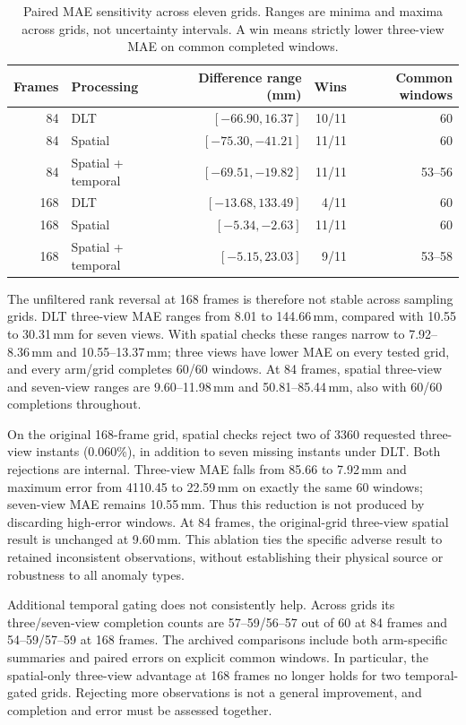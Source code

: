 \documentclass{iopjournal}
\begin{document}
\begin{table}
\caption{Paired MAE sensitivity across eleven grids. Ranges are minima and
maxima across grids, not uncertainty intervals. A win means strictly lower
three-view MAE on common completed windows.}
\centering
\begin{tabular}{rlrrr}
\hline
Frames & Processing & Difference range (mm) & Wins & Common windows\\
\hline
84 & DLT & $[-66.90,16.37]$ & 10/11 & 60\\
84 & Spatial & $[-75.30,-41.21]$ & 11/11 & 60\\
84 & Spatial + temporal & $[-69.51,-19.82]$ & 11/11 & 53--56\\
168 & DLT & $[-13.68,133.49]$ & 4/11 & 60\\
168 & Spatial & $[-5.34,-2.63]$ & 11/11 & 60\\
168 & Spatial + temporal & $[-5.15,23.03]$ & 9/11 & 53--58\\
\hline
\end{tabular}
\label{tab:gridrobust}
\end{table}

The unfiltered rank reversal at 168 frames is therefore not stable across
sampling grids. DLT three-view MAE ranges from 8.01 to 144.66\,mm, compared
with 10.55 to 30.31\,mm for seven views. With spatial checks these ranges
narrow to 7.92--8.36\,mm and 10.55--13.37\,mm; three views have lower MAE
on every tested grid, and every arm/grid completes 60/60 windows. At 84
frames, spatial three-view and seven-view ranges are 9.60--11.98\,mm and
50.81--85.44\,mm, also with 60/60 completions throughout.

On the original 168-frame grid, spatial checks reject two of 3360 requested
three-view instants (0.060\%), in addition to seven missing instants under
DLT. Both rejections are internal. Three-view MAE falls from 85.66 to
7.92\,mm and maximum error from 4110.45 to 22.59\,mm on exactly the same
60 windows; seven-view MAE remains 10.55\,mm. Thus this reduction is not
produced by discarding high-error windows. At 84 frames, the original-grid
three-view spatial result is unchanged at 9.60\,mm. This ablation ties the
specific adverse result to retained inconsistent observations, without
establishing their physical source or robustness to all anomaly types.

Additional temporal gating does not consistently help. Across grids its
three/seven-view completion counts are 57--59/56--57 out of 60 at 84 frames
and 54--59/57--59 at 168 frames. The archived comparisons include both
arm-specific summaries and paired errors on explicit common windows.
In particular, the spatial-only three-view advantage at 168 frames no longer
holds for two temporal-gated grids. Rejecting more observations is not a
general improvement, and completion and error must be assessed together.
\end{document}
